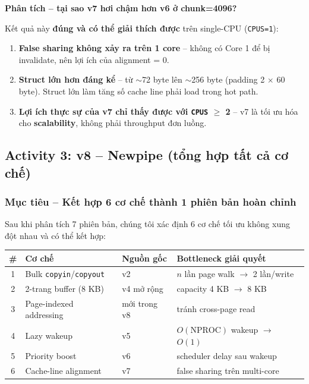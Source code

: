 \documentclass[11pt,a4paper]{article}
\begin{document}
\textbf{Phân tích -- tại sao v7 hơi chậm hơn v6 ở chunk=4096?}

Kết quả này \textbf{đúng và có thể giải thích được} trên single-CPU (\texttt{CPUS=1}):

\begin{enumerate}
  \item \textbf{False sharing không xảy ra trên 1 core} -- không có Core 1 để bị invalidate, nên lợi ích của alignment = 0.
  \item \textbf{Struct lớn hơn đáng kể} -- từ $\sim$72 byte lên $\sim$256 byte (padding 2 $\times$ 60 byte). Struct lớn làm tăng số cache line phải load trong hot path.
  \item \textbf{Lợi ích thực sự của v7 chỉ thấy được với \texttt{CPUS} $\geq$ 2} -- v7 là tối ưu hóa cho \textbf{scalability}, không phải throughput đơn luồng.
\end{enumerate}

\subsection{Activity 3: v8 -- Newpipe (tổng hợp tất cả cơ chế)}

\subsubsection{Mục tiêu -- Kết hợp 6 cơ chế thành 1 phiên bản hoàn chỉnh}

Sau khi phân tích 7 phiên bản, chúng tôi xác định 6 cơ chế tối ưu không xung đột nhau và có thể kết hợp:

\begin{center}
\begin{tabular}{clll}
\toprule
\textbf{\#} & \textbf{Cơ chế} & \textbf{Nguồn gốc} & \textbf{Bottleneck giải quyết} \\
\midrule
1 & Bulk \texttt{copyin}/\texttt{copyout}    & v2           & $n$ lần page walk $\rightarrow$ 2 lần/write \\
2 & 2-trang buffer (8 KB)                    & v4 mở rộng   & capacity 4 KB $\rightarrow$ 8 KB \\
3 & Page-indexed addressing                  & mới trong v8 & tránh cross-page read \\
4 & Lazy wakeup                              & v5           & $O(\text{NPROC})$ wakeup $\rightarrow$ $O(1)$ \\
5 & Priority boost                           & v6           & scheduler delay sau wakeup \\
6 & Cache-line alignment                     & v7           & false sharing trên multi-core \\
\bottomrule
\end{tabular}
\end{center}
\end{document}
